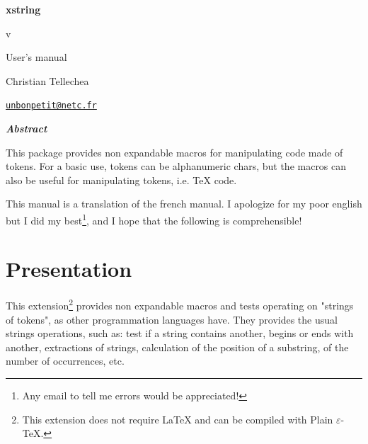\documentclass[english,a4paper,10pt]{article}
\def\xstringenglishdateaux#1/#2/#3\nil{\number#3\relax\space \ifcase #2 \or January\or February\or March\or April\or May\or June\or July\or August\or September\or October\or November\or December\fi\space#1}
\edef\xstringenglishdate{\expandafter\xstringenglishdateaux\xstringdate\nil}
\begin{document}
\setlength{\parindent}{0pt}
\begin{titlepage}
	\null\par\vfill
	\begin{center}
		\begin{minipage}{0.75\linewidth}
			\begin{center}
				\Huge\bfseries xstring\par\vspace{5pt}
				\small v\xstringversion\par\vspace{25pt}
				\normalsize User's manual
			\end{center}
		\end{minipage}
	\end{center}
	\vspace{1cm}
	\begin{center}
		Christian {\sc Tellechea}\par\small
		\href{mailto:unbonpetit@netc.fr}{\nolinkurl{unbonpetit@netc.fr}}\par\vspace{5pt}
		\xstringenglishdate
	\end{center}
	\vfill\hrulefill
	\begin{center}
		\begin{minipage}{0.85\linewidth}
			\noindent
			\hfill\textbf{\textit{Abstract}}\hfill{}\medskip\par
			This package provides non expandable macros for manipulating code made of tokens. For a basic use, tokens can be alphanumeric chars, but the macros can also be useful for manipulating tokens, i.e. \TeX{} code.
		\end{minipage}
	\end{center}
	\hrulefill\vfill{}
\end{titlepage}

\tableofcontents

This manual is a translation of the french manual. I apologize for my poor english but I did my best\footnote{Any email to tell me errors would be appreciated!}, and I hope that the following is comprehensible!
\section{Presentation}
This extension\footnote{This extension does not require \LaTeX{} and can be compiled with Plain $\varepsilon$-\TeX{}.} provides non expandable macros and tests operating on "strings of tokens", as other programmation languages have. They provides the usual strings operations, such as: test if a string contains another, begins or ends with another, extractions of strings, calculation of the position of a substring, of the number of occurrences, etc.\medskip
\end{document}

